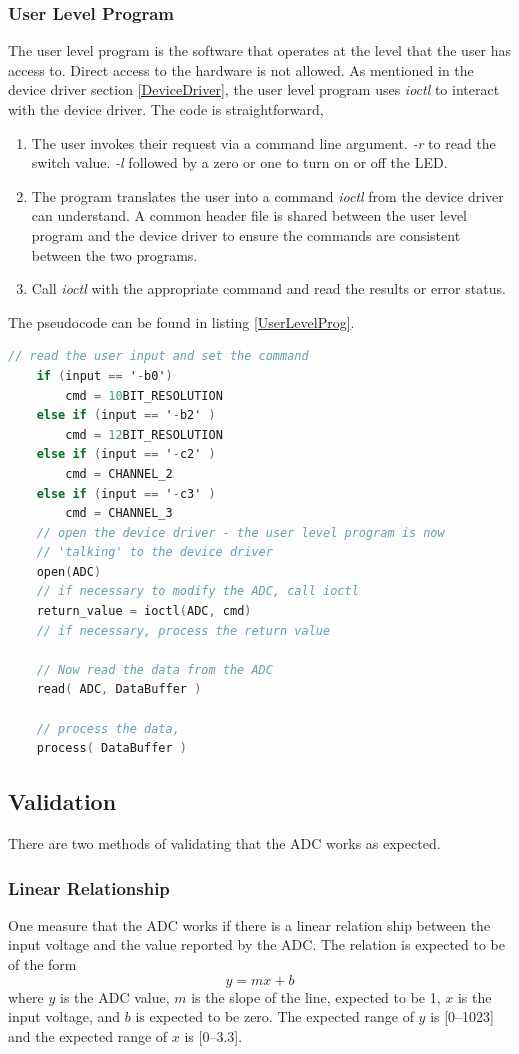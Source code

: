 \documentclass[10pt,conference]{IEEEtran}
\begin{document}
\subsubsection{User Level Program}
The user level program is the software that operates at the level that the user has access to.  Direct access to the hardware is not allowed. As mentioned in the device driver section \ref{DeviceDriver}, the user level program uses \emph{ioctl} to interact with the device driver. The code is straightforward,
\begin{enumerate}
	\item The user invokes their request via a command line argument.  \emph{-r} to read the switch value. \emph{-l} followed by a zero or one to turn on or off the LED.
	\item The program translates the user into a command \emph{ioctl} from the device driver can understand. A common header file is shared between the user level program and the device driver to ensure the commands are consistent between the two programs.
	\item Call \emph{ioctl} with the appropriate command and read the results or error status.
\end{enumerate}
The pseudocode can be found in listing \ref{UserLevelProg}.

\begin{lstlisting}[language=C, frame=single, caption=User Level Pseudo Code,label=UserLevelProg]
	// read the user input and set the command
	if (input == '-b0')
		cmd = 10BIT_RESOLUTION
	else if (input == '-b2' )
		cmd = 12BIT_RESOLUTION
	else if (input == '-c2' )
		cmd = CHANNEL_2
	else if (input == '-c3' )
		cmd = CHANNEL_3
	// open the device driver - the user level program is now
	// 'talking' to the device driver
	open(ADC)
	// if necessary to modify the ADC, call ioctl
	return_value = ioctl(ADC, cmd)
	// if necessary, process the return value

	// Now read the data from the ADC
	read( ADC, DataBuffer )

	// process the data,
	process( DataBuffer )
\end{lstlisting}

\subsection{Validation}
There are two methods of validating that the ADC works as expected.

\subsubsection{Linear Relationship}
One measure that the ADC works if there is a linear relation ship between the input voltage and the value reported by the ADC. The relation is expected to be of the form
\[
	y = mx + b
\]
where $y$ is the ADC value, $m$ is the slope of the line, expected to be 1, $x$ is the input voltage, and $b$ is expected to be zero. The expected range of $y$ is [0--1023] and the expected range of $x$ is [0--3.3].
\end{document}
